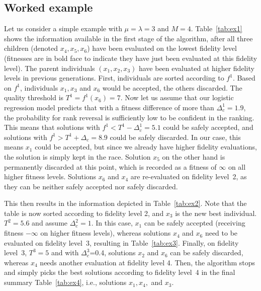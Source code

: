 \subsection{Worked example}
Let us consider a simple example with $\mu=\lambda=3$ and $M=4$. Table~\ref{tab:ex1} shows the information available in the first stage of the algorithm, after all three children (denoted $x_4, x_5, x_6$) have been evaluated on the lowest fidelity level (fitnesses are in bold face to indicate they have just been evaluated at this fidelity level). The parent individuals $(x_1, x_2, x_3)$ have been evaluated at higher fidelity levels in previous generations. First, individuals are sorted according to $f^1$. Based on $f^1$, individuals $x_1, x_3$ and $x_6$ would be accepted, the others discarded. The quality threshold is $T^1=f^1(x_6)=7$. Now let us assume that our logistic regression model predicts that with a fitness difference of more than $\Delta_c^1=1.9$, the probability for rank reversal is sufficiently low to be confident in the ranking. This means that solutions with $f^1<T^1-\Delta_c^1=5.1$ could be safely accepted, and solutions with $f^1>T^1+\Delta_c=8.9$ could be safely discarded. In our case, this means $x_1$ could be accepted, but since we already have higher fidelity evaluations, the solution is simply kept in the race. Solution $x_5$ on the other hand is permanently discarded at this point, which is recorded as a fitness of $\infty$ on all higher fitness levels. Solutions $x_6$ and $x_4$ are re-evaluated on fidelity level~2, as they can be neither safely accepted nor safely discarded.

This then results in the information depicted in Table~\ref{tab:ex2}. Note that the table is now sorted according to fidelity level 2, and $x_3$ is the new best individual. $T^2=5.6$ and assume $\Delta_c^2=1$. In this case, $x_1$ can be safely accepted (receiving fitness $-\infty$ on higher fitness levels), whereas solutions $x_4$ and $x_6$ need to be evaluated on fidelity level~3, resulting in Table~\ref{tab:ex3}. Finally, on fidelity level~3, $T^3=5$ and with $\Delta_c^3$=0.4, solutions $x_2$ and $x_6$ can be safely discarded, whereas $x_4$ needs another evaluation at fidelity level 4. Then, the algorithm stops and simply picks the best solutions according to fidelity level~4 in the final summary Table~\ref{tab:ex4}, i.e., solutions $x_1, x_4,$ and $x_3$.

